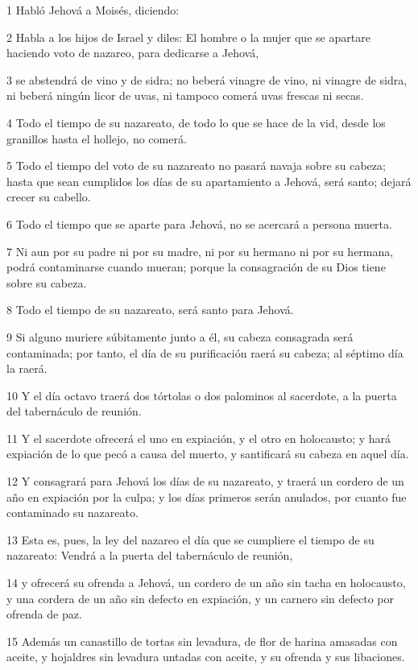 \par 1 Habló Jehová a Moisés, diciendo:
\par 2 Habla a los hijos de Israel y diles: El hombre o la mujer que se apartare haciendo voto de nazareo, para dedicarse a Jehová,
\par 3 se abstendrá de vino y de sidra; no beberá vinagre de vino, ni vinagre de sidra, ni beberá ningún licor de uvas, ni tampoco comerá uvas frescas ni secas.
\par 4 Todo el tiempo de su nazareato, de todo lo que se hace de la vid, desde los granillos hasta el hollejo, no comerá.
\par 5 Todo el tiempo del voto de su nazareato no pasará navaja sobre su cabeza; hasta que sean cumplidos los días de su apartamiento a Jehová, será santo; dejará crecer su cabello.
\par 6 Todo el tiempo que se aparte para Jehová, no se acercará a persona muerta.
\par 7 Ni aun por su padre ni por su madre, ni por su hermano ni por su hermana, podrá contaminarse cuando mueran; porque la consagración de su Dios tiene sobre su cabeza.
\par 8 Todo el tiempo de su nazareato, será santo para Jehová.
\par 9 Si alguno muriere súbitamente junto a él, su cabeza consagrada será contaminada; por tanto, el día de su purificación raerá su cabeza; al séptimo día la raerá.
\par 10 Y el día octavo traerá dos tórtolas o dos palominos al sacerdote, a la puerta del tabernáculo de reunión.
\par 11 Y el sacerdote ofrecerá el uno en expiación, y el otro en holocausto; y hará expiación de lo que pecó a causa del muerto, y santificará su cabeza en aquel día.
\par 12 Y consagrará para Jehová los días de su nazareato, y traerá un cordero de un año en expiación por la culpa; y los días primeros serán anulados, por cuanto fue contaminado su nazareato.
\par 13 Esta es, pues, la ley del nazareo el día que se cumpliere el tiempo de su nazareato: Vendrá a la puerta del tabernáculo de reunión,
\par 14 y ofrecerá su ofrenda a Jehová, un cordero de un año sin tacha en holocausto, y una cordera de un año sin defecto en expiación, y un carnero sin defecto por ofrenda de paz.
\par 15 Además un canastillo de tortas sin levadura, de flor de harina amasadas con aceite, y hojaldres sin levadura untadas con aceite, y su ofrenda y sus libaciones.
